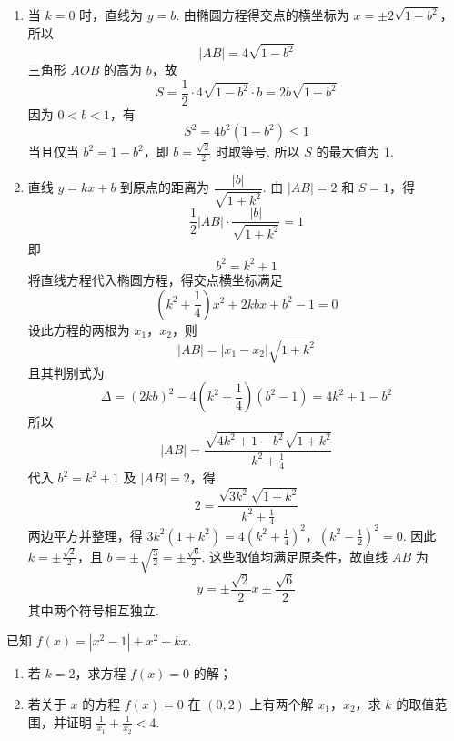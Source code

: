 \begin{solution}
\begin{enumerate}
\item 当 \(k=0\) 时，直线为 \(y=b\). 由椭圆方程得交点的横坐标为 \(x=\pm2\sqrt{1-b^2}\)，所以
\[
|AB|=4\sqrt{1-b^2}
\]
三角形 \(AOB\) 的高为 \(b\)，故
\[
S=\frac{1}{2}\cdot4\sqrt{1-b^2}\cdot b=2b\sqrt{1-b^2}
\]
因为 \(0<b<1\)，有
\[
S^2=4b^2(1-b^2)\leqslant1
\]
当且仅当 \(b^2=1-b^2\)，即 \(b=\frac{\sqrt{2}}{2}\) 时取等号. 所以 \(S\) 的最大值为 \(1\).

\item 直线 \(y=kx+b\) 到原点的距离为 \(\dfrac{|b|}{\sqrt{1+k^2}}\). 由 \(|AB|=2\) 和 \(S=1\)，得
\[
\frac{1}{2}|AB|\cdot\frac{|b|}{\sqrt{1+k^2}}=1
\]
即
\[
b^2=k^2+1
\]
将直线方程代入椭圆方程，得交点横坐标满足
\[
\left(k^2+\frac{1}{4}\right)x^2+2kbx+b^2-1=0
\]
设此方程的两根为 \(x_1\)，\(x_2\)，则
\[
|AB|=|x_1-x_2|\sqrt{1+k^2}
\]
且其判别式为
\[
\Delta=(2kb)^2-4\left(k^2+\frac{1}{4}\right)(b^2-1)=4k^2+1-b^2
\]
所以
\[
|AB|=\frac{\sqrt{4k^2+1-b^2}\sqrt{1+k^2}}{k^2+\frac{1}{4}}
\]
代入 \(b^2=k^2+1\) 及 \(|AB|=2\)，得
\[
2=\frac{\sqrt{3k^2}\sqrt{1+k^2}}{k^2+\frac{1}{4}}
\]
两边平方并整理，得
\(3k^2(1+k^2)=4\left(k^2+\frac{1}{4}\right)^2\)，\(\left(k^2-\frac{1}{2}\right)^2=0\).
因此 \(k=\pm\frac{\sqrt{2}}{2}\)，且 \(b=\pm\sqrt{\frac{3}{2}}=\pm\frac{\sqrt{6}}{2}\). 这些取值均满足原条件，故直线 \(AB\) 为
\[
y=\pm\frac{\sqrt{2}}{2}x\pm\frac{\sqrt{6}}{2}
\]
其中两个符号相互独立.
\end{enumerate}
\end{solution}

\begin{problem}
已知 \( f(x) = |x^2 - 1| + x^2 + kx \).

\begin{enumerate}
\item 若 \(k = 2\)，求方程 \(f(x) = 0\) 的解；
\item 若关于 \(x\) 的方程 \(f(x) = 0\) 在 \((0,2)\) 上有两个解 \(x_{1}\)，\(x_{2}\)，求 \(k\) 的取值范围，并证明 \(\frac{1}{x_1} + \frac{1}{x_2} < 4\).
\end{enumerate}
\end{problem}


